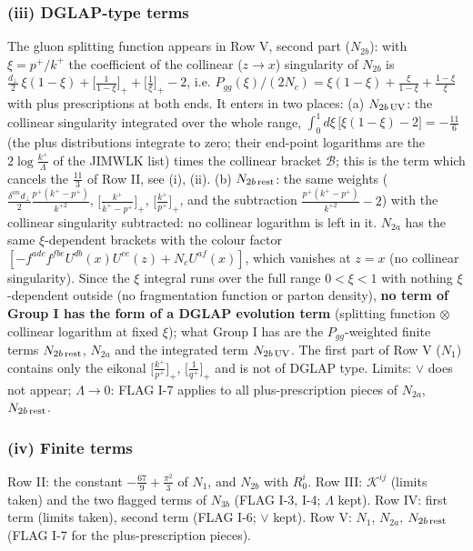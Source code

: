 \documentclass[9pt]{article}
\numberwithin{equation}{section}
\begin{document}
\subsubsection*{(iii) DGLAP-type terms}
The gluon splitting function appears in Row V, second part ($N_{2b}$): with $\xi=p^{+}/k^{+}$ the coefficient of the collinear ($z\to x$) singularity of $N_{2b}$ is
$\frac{d_{\perp}}{2}\,\xi(1-\xi)+\big[\frac{1}{1-\xi}\big]_{+}+\big[\frac{1}{\xi}\big]_{+}-2$, i.e. $P_{gg}(\xi)/(2N_{c})=\xi(1-\xi)+\frac{\xi}{1-\xi}+\frac{1-\xi}{\xi}$ with plus prescriptions at both ends. It enters in two places: (a) $N_{2b\,\rm UV}$: the collinear singularity integrated over the whole range, $\int_{0}^{1}d\xi\,\big[\xi(1-\xi)-2\big]=-\frac{11}{6}$ (the plus distributions integrate to zero; their end-point logarithms are the $2\log\frac{k^{+}}{\Lambda}$ of the JIMWLK list) times the collinear bracket $\mathcal{B}$; this is the term which cancels the $\frac{11}{3}$ of Row II, see (i), (ii). (b) $N_{2b\,\rm rest}$: the same weights ($\frac{\delta^{im}d_{\perp}}{2}\frac{p^{+}(k^{+}-p^{+})}{k^{+2}}$, $\big[\frac{k^{+}}{k^{+}-p^{+}}\big]_{+}$, $\big[\frac{k^{+}}{p^{+}}\big]_{+}$, and the subtraction $\frac{p^{+}(k^{+}-p^{+})}{k^{+2}}-2$) with the collinear singularity subtracted: no collinear logarithm is left in it. $N_{2a}$ has the same $\xi$-dependent brackets with the colour factor $[-f^{adc}f^{fbe}U^{db}(x)U^{ce}(z)+N_{c}U^{af}(x)]$, which vanishes at $z=x$ (no collinear singularity). Since the $\xi$ integral runs over the full range $0<\xi<1$ with nothing $\xi$-dependent outside (no fragmentation function or parton density), \textbf{no term of Group I has the form of a DGLAP evolution term} (splitting function $\otimes$ collinear logarithm at fixed $\xi$); what Group I has are the $P_{gg}$-weighted finite terms $N_{2b\,\rm rest}$, $N_{2a}$ and the integrated term $N_{2b\,\rm UV}$. The first part of Row V ($N_{1}$) contains only the eikonal $\big[\frac{k^{+}}{p^{+}}\big]_{+}$, $\big[\frac{1}{q^{+}}\big]_{+}$ and is not of DGLAP type. Limits: $\vee$ does not appear; $\Lambda\to0$: FLAG I-7 applies to all plus-prescription pieces of $N_{2a}$, $N_{2b\,\rm rest}$.

\subsubsection*{(iv) Finite terms}
Row II: the constant $-\frac{67}{9}+\frac{\pi^{2}}{3}$ of $N_{1}$, and $N_{2b}$ with $R^{i}_{0}$. Row III: $\mathcal{K}^{ij}$ (limits taken) and the two flagged terms of $N_{3b}$ (FLAG I-3, I-4; $\Lambda$ kept). Row IV: first term (limits taken), second term (FLAG I-6; $\vee$ kept). Row V: $N_{1}$, $N_{2a}$, $N_{2b\,\rm rest}$ (FLAG I-7 for the plus-prescription pieces).
\end{document}
